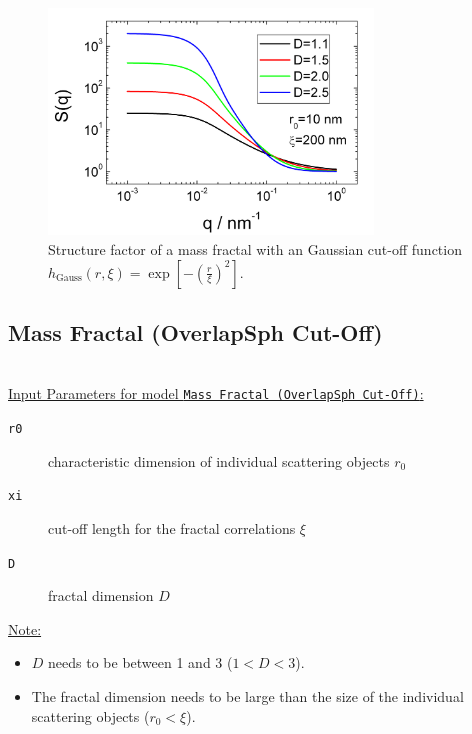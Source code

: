 \begin{figure}[htb]
\begin{center}
\includegraphics[width=0.768\textwidth,height=0.488\textwidth]{../images/structure_factor/MassFractals/SQGaussCutOff.png}
\end{center}
\caption{Structure factor of a mass fractal with an Gaussian
cut-off function $h_\text{Gauss}(r,\xi) = \exp\left[-\left(\tfrac{r}{\xi}\right)^2\right]$.}
\label{fig:SQGaussCutOff}
\end{figure}


\clearpage
\subsection{Mass Fractal (OverlapSph Cut-Off)}
~\\

\underline{Input Parameters for model \texttt{Mass Fractal (OverlapSph Cut-Off)}:}
\begin{description}
\item[\texttt{r0}] characteristic dimension of individual scattering objects $r_0$
\item[\texttt{xi}] cut-off length for the fractal correlations $\xi$
\item[\texttt{D}] fractal dimension $D$
\end{description}

\underline{Note:}
\begin{itemize}
\item $D$ needs to be between 1 and 3 ($1<D<3$).
\item The fractal dimension needs to be large than the size of the individual scattering objects ($r_0 < \xi$).
\end{itemize}

